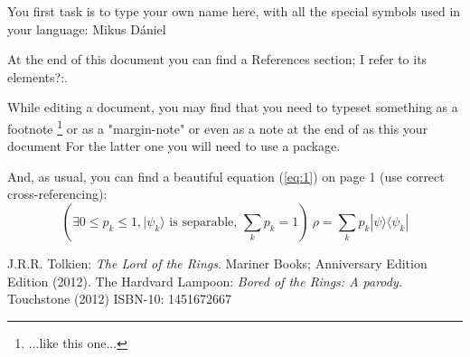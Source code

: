 \documentclass[12pt]{article}
\begin{document}
\par
You first task is to type your own name here, with all the special symbols used in your language: Mikus Dániel \par
At the end of this document you can find a References section; I refer to its elements?:\cite{Lotr, lmp}.  \par
While editing a document, you may find that you need to typeset something as a footnote \footnote{...like this one...} or as a "margin-note"  or even as a note at the end of as this your document For the latter one you will need to use a package. \par
And, as usual, you can find a beautiful equation (\ref{eq:1}) on page 1 (use correct cross-referencing):
\begin{equation} \label{eq:1}
    \left( \exists 0 \leq p_k \leq 1, | \psi _k \rangle \text{~is separable,~} \sum_k p_k = 1 \right)~ \rho = \sum_k p_k | \psi \rangle \langle \psi _k |
\end{equation}


\begin{thebibliography}{9}
J.R.R. Tolkien: 
\textit{The Lord of the Rings}. Mariner Books; Anniversary Edition
Edition (2012).
The Hardvard Lampoon:
\textit{Bored of the Rings: A parody.} Touchstone 
(2012) ISBN-10: 1451672667
\end{thebibliography}
\end{document}
